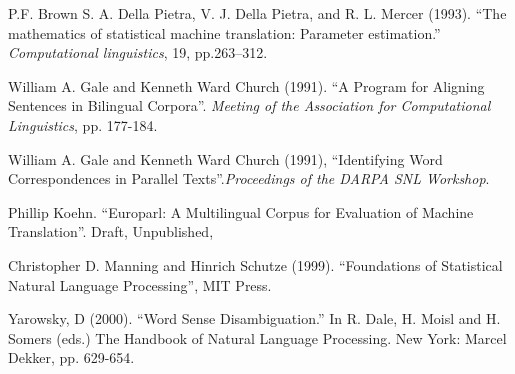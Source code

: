 \documentclass[a4wide,10pt]{article}
\begin{document}
\begin{thebibliography}{99}

 P.F. Brown  S. A. Della Pietra, V. J. Della Pietra, and 
R. L. Mercer (1993). ``The mathematics of statistical machine translation: 
Parameter estimation.'' {\it Computational linguistics}, 19, pp.263--312.

 William A. Gale and Kenneth Ward Church (1991). 
``A Program for Aligning Sentences in Bilingual Corpora''. {\it Meeting of the 
Association for Computational Linguistics}, pp. 177-184.

 William A. Gale and Kenneth Ward Church (1991),
``Identifying Word Correspondences in Parallel Texts''.{\it Proceedings of the
DARPA SNL Workshop}.

 Phillip Koehn. ``Europarl: A Multilingual Corpus for 
Evaluation of Machine Translation''. Draft, Unpublished,

 Christopher D. Manning and Hinrich Schutze (1999).
``Foundations of Statistical Natural Language Processing'', MIT Press.

 Yarowsky, D (2000). ``Word Sense Disambiguation.'' 
In R. Dale, H. Moisl and H. Somers (eds.) The Handbook of Natural Language 
Processing.  New York: Marcel Dekker, pp. 629-654. 

\end{thebibliography}
\end{document}
